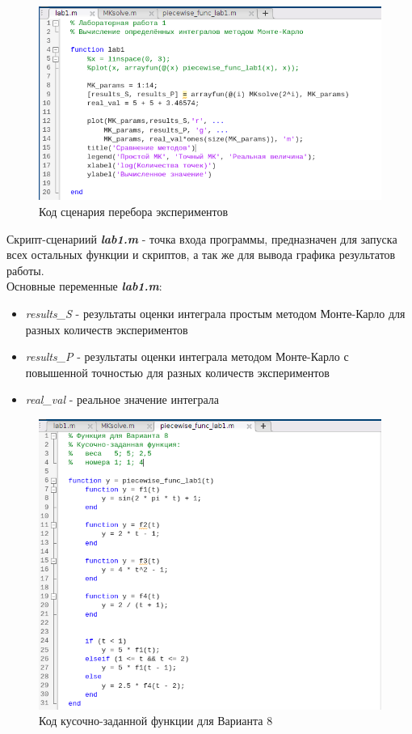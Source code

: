 \documentclass[12pt]{article}
\begin{document}
 \begin{figure}[!h]
	\centering
	\includegraphics[width=\linewidth]{lab1.png}
	\caption{Код сценария перебора экспериментов}
\end{figure}

Скрипт-сценариий \textbf{\textit{lab1.m}} - точка входа программы, предназначен для запуска всех остальных функции и скриптов, а так же для вывода графика результатов работы.\\

Основные переменные \textbf{\textit{lab1.m}}:
\begin{itemize}
	\item {\textit{results\_S}} - результаты оценки интеграла простым методом Монте-Карло для разных количеств экспериментов
	\item \textit{results\_P} - результаты оценки интеграла методом Монте-Карло с повышенной точностью для разных количеств экспериментов
	\item \textit{real\_val} - реальное значение интеграла
\end{itemize}
 
\begin{figure}[!h]
	\centering
	\includegraphics[width=\linewidth]{piecewise_func.png}
	\caption{Код кусочно-заданной функции для Варианта 8}
\end{figure}
\end{document}
